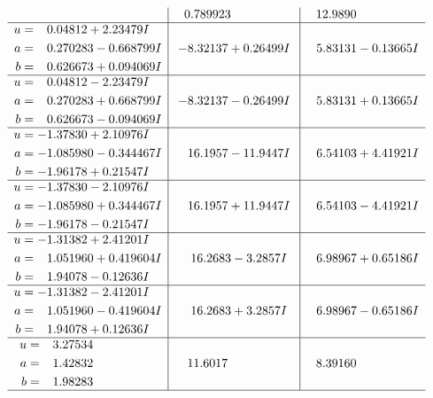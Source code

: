 \documentclass[1p]{elsarticle_modified}
\theoremstyle{definition}
\begin{document}
$$\begin{array}{c|c|c}
 & \phantom{-}0.789923\phantom{ +0.000000I} & \phantom{-}12.9890\phantom{ +0.000000I} \\ \hline\begin{aligned}
u &= \phantom{-}0.04812 + 2.23479 I \\
a &= \phantom{-}0.270283 - 0.668799 I \\
b &= \phantom{-}0.626673 + 0.094069 I\end{aligned}
 & -8.32137 + 0.26499 I & \phantom{-}5.83131 - 0.13665 I \\ \hline\begin{aligned}
u &= \phantom{-}0.04812 - 2.23479 I \\
a &= \phantom{-}0.270283 + 0.668799 I \\
b &= \phantom{-}0.626673 - 0.094069 I\end{aligned}
 & -8.32137 - 0.26499 I & \phantom{-}5.83131 + 0.13665 I \\ \hline\begin{aligned}
u &= -1.37830 + 2.10976 I \\
a &= -1.085980 - 0.344467 I \\
b &= -1.96178 + 0.21547 I\end{aligned}
 & \phantom{-}16.1957 - 11.9447 I & \phantom{-}6.54103 + 4.41921 I \\ \hline\begin{aligned}
u &= -1.37830 - 2.10976 I \\
a &= -1.085980 + 0.344467 I \\
b &= -1.96178 - 0.21547 I\end{aligned}
 & \phantom{-}16.1957 + 11.9447 I & \phantom{-}6.54103 - 4.41921 I \\ \hline\begin{aligned}
u &= -1.31382 + 2.41201 I \\
a &= \phantom{-}1.051960 + 0.419604 I \\
b &= \phantom{-}1.94078 - 0.12636 I\end{aligned}
 & \phantom{-}16.2683 - 3.2857 I & \phantom{-}6.98967 + 0.65186 I \\ \hline\begin{aligned}
u &= -1.31382 - 2.41201 I \\
a &= \phantom{-}1.051960 - 0.419604 I \\
b &= \phantom{-}1.94078 + 0.12636 I\end{aligned}
 & \phantom{-}16.2683 + 3.2857 I & \phantom{-}6.98967 - 0.65186 I \\ \hline\begin{aligned}
u &= \phantom{-}3.27534\phantom{ +0.000000I} \\
a &= \phantom{-}1.42832\phantom{ +0.000000I} \\
b &= \phantom{-}1.98283\phantom{ +0.000000I}\end{aligned}
 & \phantom{-}11.6017\phantom{ +0.000000I} & \phantom{-}8.39160\phantom{ +0.000000I}\\
 \hline 
 \end{array}$$\newpage\newpage\renewcommand{\arraystretch}{1}
\end{document}
